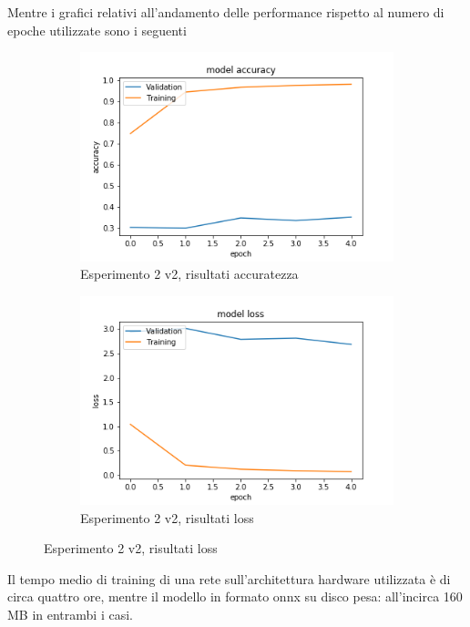 Mentre i grafici relativi all'andamento delle performance rispetto al numero di epoche utilizzate sono i seguenti
\begin{figure}[H]
    \begin{subfigure}[b]{0.5\textwidth}
        \includegraphics[width=\textwidth]{./plots/exp2_p2_acc.png}
        \caption{Esperimento 2 v2, risultati accuratezza} 
        \label{fig:plot_exp2_p2_acc}
    \end{subfigure}
    \begin{subfigure}[b]{0.5\textwidth}
        \includegraphics[width=\textwidth]{./plots/exp2_p2_loss.png}
        \caption{Esperimento 2 v2, risultati loss} 
        \label{fig:plot_exp2_p2_loss}
	\end{subfigure}
\end{figure}
Il tempo medio di training di una rete sull'architettura hardware utilizzata è di circa quattro ore, mentre il modello in formato onnx su disco pesa: all'incirca 160 MB in entrambi i casi.


